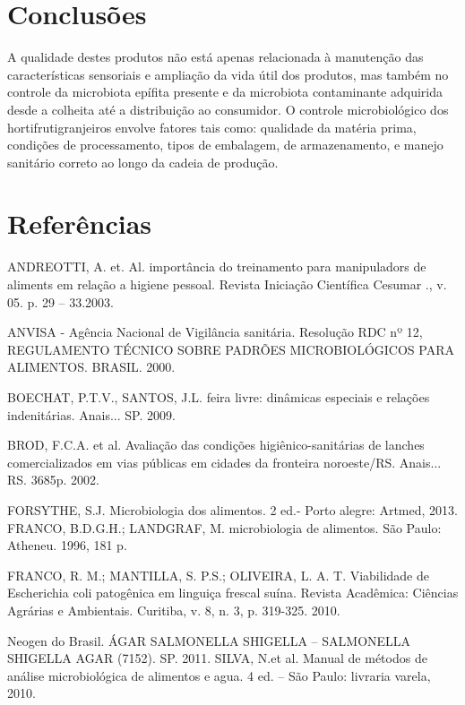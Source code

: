 \documentclass[article,12pt,onesidea,4paper,english,brazil]{abntex2}
\begin{document}
	\section*{Conclusões}
	
A qualidade destes produtos não está apenas relacionada à manutenção das características sensoriais e ampliação da vida útil dos produtos, mas também no controle da microbiota epífita presente e da microbiota contaminante adquirida desde a colheita até a distribuição ao consumidor. O controle microbiológico dos hortifrutigranjeiros envolve fatores tais como: qualidade da matéria prima, condições de processamento, tipos de embalagem, de armazenamento, e manejo sanitário correto ao longo da cadeia de produção.
	

	\section*{Referências}
	
	\sloppy
	
\noindent ANDREOTTI, A. et. Al. importância do treinamento para manipuladors de aliments em relação a higiene pessoal. Revista Iniciação Científica Cesumar ., v. 05. p. 29 – 33.2003.

\noindent ANVISA - Agência Nacional de Vigilância sanitária. Resolução RDC nº 12, REGULAMENTO TÉCNICO SOBRE PADRÕES MICROBIOLÓGICOS PARA ALIMENTOS. BRASIL. 2000.

\noindent BOECHAT, P.T.V., SANTOS, J.L. feira livre: dinâmicas especiais e relações indenitárias. Anais... SP. 2009.

\noindent BROD, F.C.A. et al. Avaliação das condições higiênico-sanitárias de lanches comercializados em vias públicas em cidades da fronteira noroeste/RS. Anais... RS. 3685p. 2002.

\noindent FORSYTHE, S.J. Microbiologia dos alimentos. 2 ed.- Porto alegre: Artmed, 2013. FRANCO, B.D.G.H.; LANDGRAF, M. microbiologia de alimentos. São Paulo:
Atheneu. 1996, 181 p.

\noindent FRANCO, R. M.; MANTILLA, S. P.S.; OLIVEIRA, L. A. T. Viabilidade de Escherichia coli patogênica em linguiça frescal suína. Revista Acadêmica: Ciências Agrárias e Ambientais. Curitiba, v. 8, n. 3, p. 319-325. 2010.

\noindent Neogen do Brasil. ÁGAR SALMONELLA SHIGELLA – SALMONELLA SHIGELLA AGAR (7152). SP. 2011.
SILVA, N.et al. Manual de métodos de análise microbiológica de alimentos e agua. 4 ed. – São Paulo: livraria varela, 2010.

	
\end{document}
